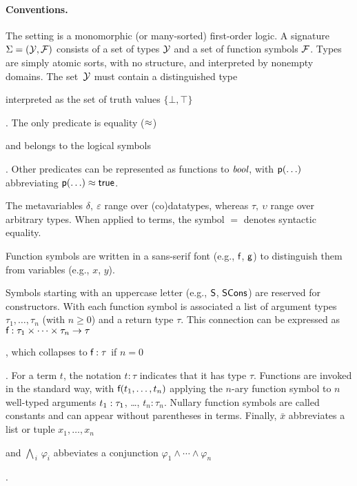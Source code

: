 \paragraph{Conventions.}
The setting is a monomorphic (or many-sorted) first-order logic.
A signature $\mathrm{\Sigma} = (\mathcal{Y}, \mathcal{F})$ consists of a set of types $\mathcal{Y}$ and a
set of function symbols $\mathcal{F}$. Types are simply atomic sorts, with no
structure, and interpreted by nonempty domains. The set~$\mathcal{Y}$ must contain a
distinguished type \begin{report} interpreted as the set of truth
values $\{\bot, \top\}$\end{report}. %
The only predicate is equality ($\approx$)\begin{report} and belongs to the logical symbols\end{report}.
Other predicates can be represented as functions to $\textit{bool}$,
with $\textsf{p}(\ldots)$ abbreviating $\textsf{p}(\ldots) \approx \textsf{true}$.
\begin{report}
The metavariables $\delta,\:\varepsilon$ range over (co)datatypes,
whereas $\tau,\:\upsilon$ range over arbitrary types.
When applied to terms, the symbol $=$ denotes syntactic equality.\end{report}

\begin{report}
Function symbols are written in a sans-serif font (e.g., $\textsf{f}$, $\textsf{g}$) to
distinguish them from variables (e.g., $x$, $y$).
\end{report}
Symbols starting with an uppercase letter (e.g.,
$\textsf{S}$, $\textsf{SCons}$) are reserved for constructors. With each function symbol 
is associated a list of argument types $\tau_1,\ldots,\tau_n$ (with $n \ge 0$)
and a return type $\tau$. This connection can be expressed %
as $\textsf{f} : \tau_1 \times \cdots \times \tau_n \to \tau$\begin{report},
which collapses to $\textsf{f} : \tau$ if $n = 0$\end{report}.
For a term $t$, the notation $t : \tau$ indicates that it has type $\tau$.
Functions are invoked in the standard way, with $\textsf{f}(t_1,\ldots,t_n)$
applying the $n$-ary function symbol
 to $n$ well-typed arguments $t_1 :\nobreak \tau_1$, \ldots, $t_n :
\tau_n$. Nullary function symbols are called constants and can appear without
parentheses in terms.
%
Finally, $\bar x$ abbreviates a list or tuple $x_1,\ldots,x_n$\begin{report}
and $\bigwedge_{\,i}\, \varphi_i$ abbeviates a conjunction
$\varphi_1 \mathrel\land \cdots \mathrel\land \varphi_n$\end{report}.

